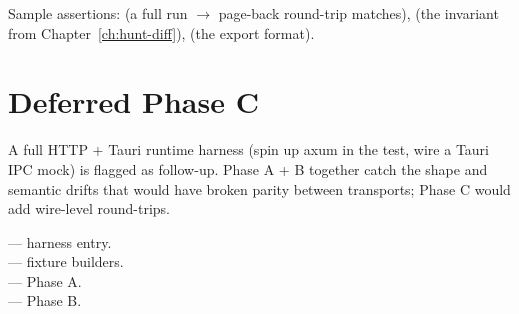 Sample assertions: 
(a full run $\to$ page-back round-trip matches),  (the
invariant from Chapter~\ref{ch:hunt-diff}),
(the export format).

\section{Deferred Phase C}

A full HTTP + Tauri runtime harness (spin up axum in the test,
wire a Tauri IPC mock) is flagged as follow-up. Phase A + B
together catch the shape and semantic drifts that would have
broken parity between transports; Phase C would add wire-level
round-trips.

\begin{inthecode}
 --- harness entry.\\
 --- fixture
builders.\\
 --- Phase A.\\
 --- Phase B.
\end{inthecode}
